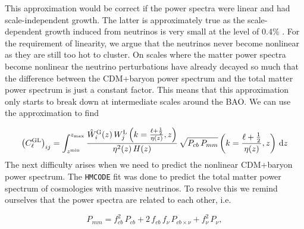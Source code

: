 \documentclass[../main.tex]{subfiles}
\begin{document}
This approximation would be correct if the power spectra were linear and had scale-independent growth. The latter is approximately true as the scale-dependent growth induced from neutrinos is very small at the level of 0.4\% \cite{Euclid:2019clj}. For the requirement of linearity, we argue that the neutrinos never become nonlinear as they are still too hot to cluster.  On scales where the matter power spectra become nonlinear the neutrino perturbations have already decayed so much that the difference between the CDM+baryon power spectrum and the total matter power spectrum is just a constant factor. This means that this approximation only starts to break down at intermediate scales around the BAO. We can use the approximation to find 

\begin{equation}
    \left(C^\mathrm{GL}_{\ell}\right)_{ij} = \int_{z^\mathrm{min}}^{z_\mathrm{max}} \frac{\hat{W}^\mathrm{G}_i(z)\,W^\mathrm{L}_j\left(k=\frac{\ell+\frac{1}{2}}{\eta(z)},z\right)}{\eta^2(z)\,H(z)}\,\sqrt{P_{cb}\,P_{mm}}\left(k=\frac{\ell+\frac{1}{2}}{\eta(z)},z\right)\,\mathrm{d} z
\end{equation}
The next difficulty arises when we need to predict the nonlinear CDM+baryon power spectrum. The {\tt HMCODE} fit was done to predict the total matter power spectrum of cosmologies with massive neutrinos. To resolve this we remind ourselves that the power spectra are related to each other, i.e. 

\begin{equation}
    P_{mm} = f_{cb}^2\,P_{cb}+2\,f_{cb}\,f_\nu\,P_{cb\times\nu}+f_{\nu}^2\,P_{\nu},
\end{equation} 
\end{document}
